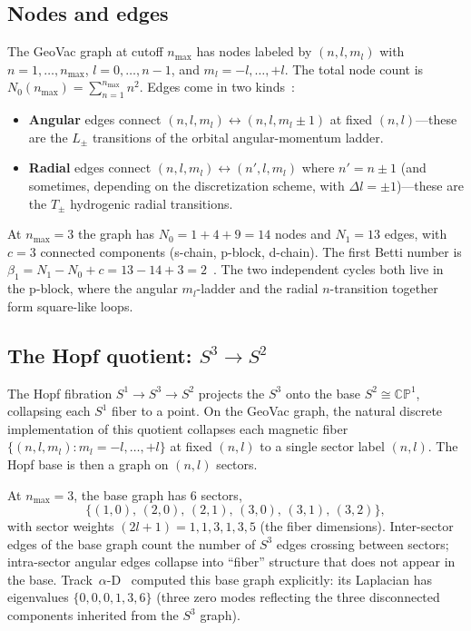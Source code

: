\documentclass[aps,pra,twocolumn,superscriptaddress,longbibliography]{revtex4-2}
\begin{document}
\subsection{Nodes and edges}

The GeoVac graph at cutoff $n_{\max}$ has nodes labeled by
$(n, l, m_l)$ with $n = 1, \ldots, n_{\max}$, $l = 0, \ldots, n-1$,
and $m_l = -l, \ldots, +l$.  The total node count is
$N_0(n_{\max}) = \sum_{n=1}^{n_{\max}} n^2$.  Edges come in two
kinds~\cite{Paper7,Paper14}:
\begin{itemize}
\item \textbf{Angular} edges connect
  $(n, l, m_l) \leftrightarrow (n, l, m_l \pm 1)$ at fixed
  $(n, l)$---these are the $L_\pm$ transitions of the orbital
  angular-momentum ladder.
\item \textbf{Radial} edges connect
  $(n, l, m_l) \leftrightarrow (n', l, m_l)$ where $n' = n \pm 1$
  (and sometimes, depending on the discretization scheme, with
  $\Delta l = \pm 1$)---these are the $T_\pm$ hydrogenic radial
  transitions.
\end{itemize}
At $n_{\max} = 3$ the graph has $N_0 = 1 + 4 + 9 = 14$ nodes and
$N_1 = 13$ edges, with $c = 3$ connected components (s-chain,
p-block, d-chain).  The first Betti number is
$\beta_1 = N_1 - N_0 + c = 13 - 14 + 3 = 2$~\cite{Q1B}.  The two
independent cycles both live in the p-block, where the angular
$m_l$-ladder and the radial $n$-transition together form square-like
loops.

\subsection{The Hopf quotient: $S^3 \to S^2$}

The Hopf fibration $S^1 \to S^3 \to S^2$ projects the $S^3$ onto the
base $S^2 \cong \mathbb{CP}^1$, collapsing each $S^1$ fiber to a
point.  On the GeoVac graph, the natural discrete implementation of
this quotient collapses each magnetic fiber $\{(n, l, m_l) :
m_l = -l, \ldots, +l\}$ at fixed $(n, l)$ to a single sector label
$(n, l)$.  The Hopf base is then a graph on $(n, l)$ sectors.

At $n_{\max} = 3$, the base graph has 6 sectors,
\begin{equation}
\{(1,0),\, (2,0),\, (2,1),\, (3,0),\, (3,1),\, (3,2)\},
\label{eq:s2_sectors}
\end{equation}
with sector weights $(2l+1) = 1, 1, 3, 1, 3, 5$ (the fiber
dimensions).  Inter-sector edges of the base graph count the number
of $S^3$ edges crossing between sectors; intra-sector angular edges
collapse into ``fiber'' structure that does not appear in the base.
Track~$\alpha$-D~\cite{Paper2} computed this base graph explicitly:
its Laplacian has eigenvalues $\{0, 0, 0, 1, 3, 6\}$ (three zero
modes reflecting the three disconnected components inherited from
the $S^3$ graph).
\end{document}
